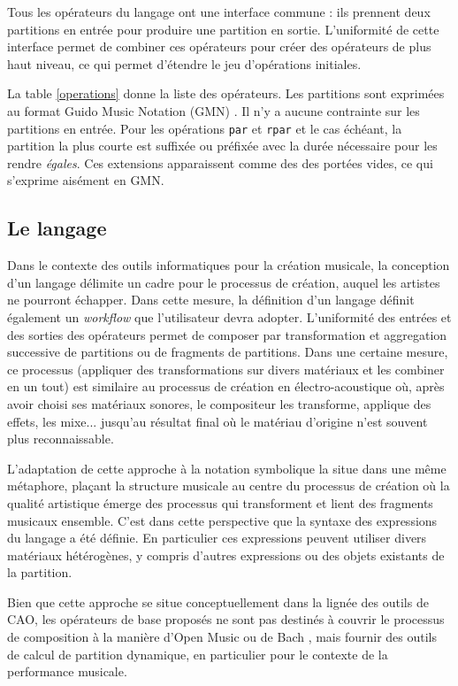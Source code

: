 \documentclass{article}
\newcommand{\OSC}[1]	{{\fontsize{10pt}{10pt} \selectfont\texttt{#1}}}
\begin{document}
Tous les opérateurs du langage ont une interface commune : ils prennent deux partitions en entrée pour produire une partition en sortie. L'uniformité de cette interface permet de combiner ces opérateurs pour créer des opérateurs de plus haut niveau, ce qui permet d'étendre le jeu d'opérations initiales. 
 
La table \ref{operations} donne la liste des opérateurs.
Les partitions sont exprimées au format Guido Music Notation (GMN) \cite{hoos98}. Il n'y a aucune contrainte sur les partitions en entrée. Pour les opérations \OSC{par} et \OSC{rpar} et le cas échéant, la partition la plus courte est suffixée ou préfixée avec la durée nécessaire pour les rendre \emph{égales}. Ces extensions apparaissent comme des des portées vides, ce qui s'exprime aisément en GMN.


\subsection{Le langage}

Dans le contexte des outils informatiques pour la création musicale, la conception d'un langage délimite un cadre pour le processus de création, auquel les artistes ne pourront échapper. Dans cette mesure, la définition d'un langage définit également un \textit{workflow} que l'utilisateur devra adopter. 
L'uniformité des entrées et des sorties des opérateurs permet de composer par transformation et aggregation successive de partitions ou de fragments de partitions. Dans une certaine mesure, ce processus (appliquer des transformations sur divers matériaux et les combiner en un tout) est similaire au processus de création en électro-acoustique où, après avoir choisi ses matériaux sonores, le compositeur les transforme, applique des effets, les mixe... jusqu'au résultat final où le matériau d'origine n'est souvent plus reconnaissable.

L'adaptation de cette approche à la notation symbolique la situe dans une même métaphore, plaçant la structure musicale au centre du processus de création où la qualité artistique émerge des processus qui transforment et lient des fragments musicaux ensemble.
C'est dans cette perspective que la syntaxe des expressions du langage a été définie. En particulier ces expressions peuvent utiliser divers matériaux hétérogènes, y compris d'autres expressions ou des objets existants de la partition.

Bien que cette approche se situe conceptuellement dans la lignée des outils de CAO, les opérateurs de base proposés ne sont pas destinés à couvrir le processus de composition à la manière d'Open Music \cite{bresson:hal-01182394} ou de Bach  \cite{agostini12b}, mais fournir des outils de calcul de partition dynamique, en particulier pour le contexte de la performance musicale.
\end{document}
